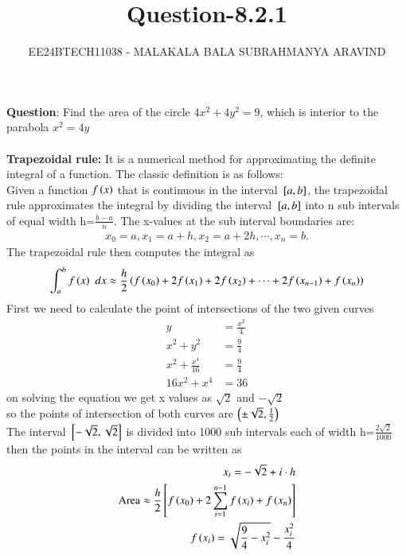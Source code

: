 \documentclass[journal]{IEEEtran}
\numberwithin{equation}{enumi}
\numberwithin{figure}{enumi}
\begin{document}

\title{Question-8.2.1}
\author{EE24BTECH11038 - MALAKALA BALA SUBRAHMANYA ARAVIND}
{\let\newpage\relax\maketitle}
\textbf{Question}:
Find the area of the circle $4x^2+4y^2=9$, which is interior to the parabola $x^2=4y$\\
\solution \\

\noindent \textbf{Trapezoidal rule:} It is a numerical method for approximating the definite integral of a function. The classic definition is as follows:\\
Given a function $f\left(x\right)$ that is continuous in the interval ${}\left[a,b\right]$, the trapezoidal rule approximates the integral by dividing the interval ${}\left[a,b\right]$ into n sub intervals of equal width h=$\frac{b-a}{n}$. The x-values at the sub interval boundaries are: 
\begin{align}
    x_0=a,x_1=a+h,x_2=a+2h,\cdots,x_n=b.
\end{align}
The trapezoidal rule then computes the integral as
\begin{align}
    \int_a^b f\left(x\right)\,\,dx \approx \frac{h}{2}\left(f\left(x_0\right)+2f\left(x_1\right)+2f\left(x_2\right)+\cdots +2f\left(x_{n-1}\right)+f\left(x_{n}\right)\right)
\end{align}
First we need to calculate the point of intersections of the two given curves
\begin{align}
    y&=\frac{x^2}{4}\\
    x^2+y^2&=\frac{9}{4}\\
    x^2+\frac{x^4}{16}&=\frac{9}{4}\\
    16x^2+x^4&=36
\end{align}
on solving the equation we get x values as $\sqrt{2}$ and $-\sqrt{2}$\\
so the points of intersection of both curves are $\left(\pm \sqrt{2},\frac{1}{2}\right)$\\
The interval ${}\left[-\sqrt{2},\sqrt{2}\right]$ is divided into 1000 sub intervals each of width h=$\frac{2\sqrt{2}}{1000}$ then the points in the interval can be written as 
\begin{align}
    x_i=-\sqrt{2}+i\cdot h\\
    \text{Area} \approx \frac{h}{2}{}\left[f\left(x_0\right)+2\sum_{i=1}^{n-1} f\left(x_i\right)+f\left(x_n\right)\right]\\
    f\left(x_i\right)=\sqrt{\frac{9}{4}-x_i^2}-\frac{x_i^2}{4}
\end{align}
\end{document}
